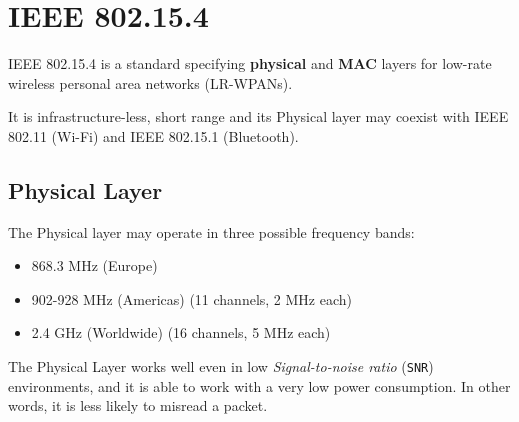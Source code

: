 
\chapter{IEEE 802.15.4}

IEEE 802.15.4 is a standard specifying \textbf{physical} and \textbf{MAC} layers for low-rate wireless personal area networks (LR-WPANs).

It is infrastructure-less, short range and its Physical layer may coexist with IEEE 802.11 (Wi-Fi) and IEEE 802.15.1 (Bluetooth). 

\section*{Physical Layer}

The Physical layer may operate in three possible frequency bands:
\begin{itemize}
   \item 868.3 MHz (Europe)
   \item 902-928 MHz (Americas) (11 channels, 2 MHz each)
   \item 2.4 GHz (Worldwide) (16 channels, 5 MHz each)
\end{itemize}

The Physical Layer works well even in low \textit{Signal-to-noise ratio} (\texttt{SNR}) environments, and it is able to work with a very low power consumption.
In other words, it is less likely to misread a packet.



